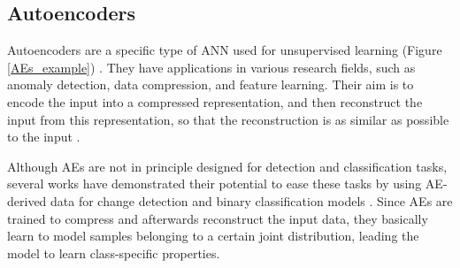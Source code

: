 \documentclass[journal,article,submit,pdftex,moreauthors]{Definitions/mdpi}
\begin{document}
\subsection{Autoencoders}\label{aes}
Autoencoders are a specific type of ANN used for unsupervised learning (Figure \ref{AEs_example}) \cite{Bank2020, Bank2023}. They have applications in various research fields, such as anomaly detection, data compression, and feature learning. Their aim is to encode the input into a compressed representation, and then reconstruct the input from this representation, so that the reconstruction is as similar as possible to the input \cite{Tzelepi2022,Zhang2019}. 

Although \ac{AEs} are not in principle designed for detection and classification tasks, several works have demonstrated their potential to ease these tasks by using \ac{AE}-derived data for change detection and binary classification models \cite{LopezFandino2018,Luppino2024,Kalinicheva2019}. Since \ac{AEs} are trained to compress and afterwards reconstruct the input data, they basically learn to model samples belonging to a certain joint distribution, leading the model to learn class-specific properties.


\end{document}

